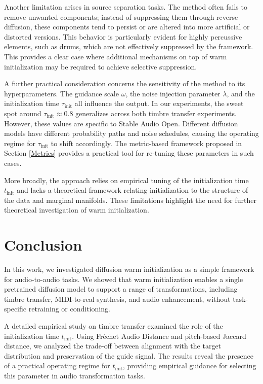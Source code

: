 Another limitation arises in source separation tasks. The method often fails to remove unwanted components; instead of suppressing them through reverse diffusion, these components tend to persist or are altered into more artificial or distorted versions. This behavior is particularly evident for highly percussive elements, such as drums, which are not effectively suppressed by the framework. This provides a clear case where additional mechanisms on top of warm initialization may be required to achieve selective suppression.

A further practical consideration concerns the sensitivity of the method to its hyperparameters. The guidance scale $\omega$, the noise injection parameter $\lambda$, and the initialization time $\tau_\text{init}$ all influence the output. In our experiments, the sweet spot around $\tau_\text{init} \approx 0.8$ generalizes across both timbre transfer experiments. However, these values are specific to Stable Audio Open. Different diffusion models have different probability paths and noise schedules, causing the operating regime for $\tau_\text{init}$ to shift accordingly.  The metric-based framework proposed in Section \ref{Metrics} provides a practical tool for re-tuning these parameters in such cases.

More broadly, the approach relies on empirical tuning of the initialization time $t_\text{init}$ and lacks a theoretical framework relating initialization to the structure of the data and marginal manifolds. These limitations highlight the need for further theoretical investigation of warm initialization.

\section{Conclusion}

\label{conclusion}
In this work, we investigated diffusion warm initialization as a simple framework for audio-to-audio tasks. We showed that warm initialization enables a single pretrained diffusion model to support a range of transformations, including timbre transfer, MIDI-to-real synthesis, and audio enhancement, without task-specific retraining or conditioning. 

A detailed empirical study on timbre transfer examined the role of the initialization time $t_\text{init}$. Using Fréchet Audio Distance and pitch-based Jaccard distance, we analyzed the trade-off between alignment with the target distribution and preservation of the guide signal. The results reveal the presence of a practical operating regime for $t_\text{init}$, providing empirical guidance for selecting this parameter in audio transformation tasks.

